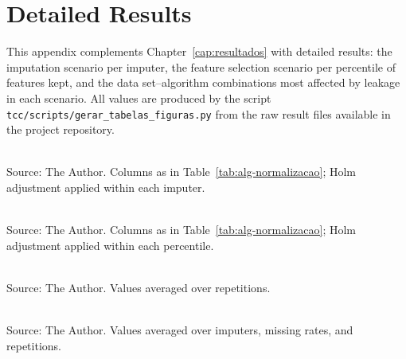 \chapter{Detailed Results}
\label{ap:tabelas}

This appendix complements Chapter~\ref{cap:resultados} with detailed results:
the imputation scenario per imputer, the feature selection scenario per
percentile of features kept, and the data set--algorithm combinations most
affected by leakage in each scenario. All values are
produced by the script \texttt{tcc/scripts/gerar\_tabelas\_figuras.py} from the
raw result files available in the project repository.

\begin{table}[htb]
\centering
\caption{Effect of leakage in the imputation scenario, per imputer and algorithm.}
\label{tab:alg-imputador}
\small
\setlength{\tabcolsep}{3pt}

\\[2pt]
\footnotesize Source: The Author. Columns as in Table~\ref{tab:alg-normalizacao}; Holm adjustment applied within each imputer.
\end{table}

\begin{table}[htb]
\centering
\caption{Effect of leakage in the feature selection scenario, per percentile and algorithm.}
\label{tab:alg-percentil}
\small
\setlength{\tabcolsep}{3pt}

\\[2pt]
\footnotesize Source: The Author. Columns as in Table~\ref{tab:alg-normalizacao}; Holm adjustment applied within each percentile.
\end{table}

\begin{table}[htb]
\centering
\caption{Data set--algorithm combinations with the largest mean $\Delta R^2$ in the normalization scenario.}
\label{tab:top-normalizacao}
\small

\\[2pt]
\footnotesize Source: The Author. Values averaged over repetitions.
\end{table}

\begin{table}[htb]
\centering
\caption{Data set--algorithm combinations with the largest mean $\Delta R^2$ in the imputation scenario.}
\label{tab:top-imputacao}
\small

\\[2pt]
\footnotesize Source: The Author. Values averaged over imputers, missing rates, and repetitions.
\end{table}


